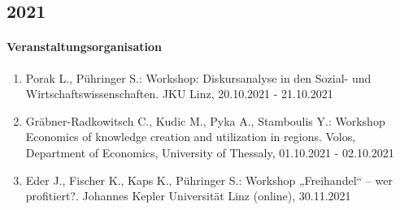 \subsection*{2021}
\paragraph{Veranstaltungsorganisation}
\begin{enumerate}[leftmargin=*, labelsep=0.5cm]
\item Porak L., Pühringer S.: Workshop: Diskursanalyse in den Sozial- und Wirtschaftswissenschaften. JKU Linz, 20.10.2021 - 21.10.2021
\item Gräbner-Radkowitsch C., Kudic M., Pyka A., Stamboulis Y.: Workshop Economics of knowledge creation and utilization in regions. Volos, Department of Economics, University of Thessaly, 01.10.2021 - 02.10.2021
\item Eder J., Fischer K., Kaps K., Pühringer S.: Workshop „Freihandel“ – wer profitiert?. Johannes Kepler Universität Linz (online), 30.11.2021
\end{enumerate}


